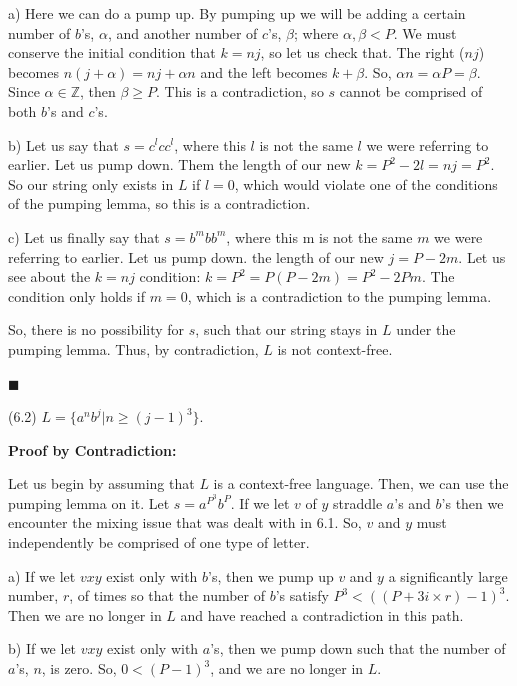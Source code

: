 \documentclass[11pt]{article}
\begin{document}
a) Here we can do a pump up. By pumping up we will be adding a certain number of $b$'s, $\alpha$, and another number of $c$'s, $\beta$; where $\alpha, \beta < P$. We must conserve the initial condition that $k=nj$, so let us check that. The right ($nj$) becomes $n(j+\alpha) = nj + \alpha n$ and the left becomes $k + \beta$. So, $\alpha n = \alpha P= \beta$. Since $\alpha \in \mathbb{Z}$, then $\beta \geq P$. This is a contradiction, so $s$ cannot be comprised of both $b$'s and $c$'s.

b) Let us say that $s = c^lcc^l$, where this $l$ is not the same $l$ we were referring to earlier. Let us pump down. Them the length of our new $k = P^2 - 2l = nj = P^2$. So our string only exists in $L$ if $l = 0$, which would violate one of the conditions of the pumping lemma, so this is a contradiction.

c) Let us finally say that $s = b^m b b^m$, where this m is not the same $m$ we were referring to earlier. Let us pump down. the length of our new $j= P - 2m$. Let us see about the $k = nj$ condition: $k = P^2 = P(P-2m) = P^2 - 2Pm$. The condition only holds if $m =0$, which is a contradiction to the pumping lemma. 

So, there is no possibility for $s$, such that our string stays in $L$ under the pumping lemma. Thus, by contradiction, $L$ is not context-free. 

\begin{flushright}$\blacksquare$\end{flushright}

\newpage

(6.2) $L=\{a^nb^j|n\geq (j-1)^3\}$.
\newline

\textbf{Proof by Contradiction:}


Let us begin by assuming that $L$ is a context-free language. Then, we can use the pumping lemma on it. Let $s = a^{P^3}b^P$. If we let $v$ of $y$ straddle $a$'s and $b$'s then we encounter the mixing issue that was dealt with in 6.1. So, $v$ and $y$ must independently be comprised of one type of letter. 

a) If we let $vxy$ exist only with $b$'s, then we pump up $v$ and $y$ a significantly large number, $r$, of times so that the number of $b$'s satisfy $P^3<((P+3i\times r)-1)^3$. Then we are no longer in $L$ and have reached a contradiction in this path.

b) If we let $vxy$ exist only with $a$'s, then we pump down such that the number of $a$'s, $n$, is zero. So, $0<(P-1)^3$, and we are no longer in $L$.
\end{document}
